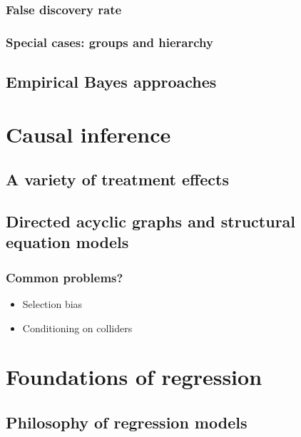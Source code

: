 \documentclass[]{book}
\providecommand{\tightlist}{%
  \setlength{\itemsep}{0pt}\setlength{\parskip}{0pt}}
\theoremstyle{definition}
\theoremstyle{definition}
\theoremstyle{definition}
\theoremstyle{remark}
\begin{document}
\subsection{False discovery rate}\label{false-discovery-rate}

\subsection{Special cases: groups and
hierarchy}\label{special-cases-groups-and-hierarchy-1}

\section{Empirical Bayes approaches}\label{empirical-bayes-approaches}

\chapter{Causal inference}\label{causal-inference}

\section{A variety of treatment
effects}\label{a-variety-of-treatment-effects}

\section{Directed acyclic graphs and structural equation
models}\label{directed-acyclic-graphs-and-structural-equation-models}

\subsection{Common problems?}\label{common-problems}

\begin{itemize}
\tightlist
\item
  Selection bias
\item
  Conditioning on colliders
\end{itemize}

\chapter{Foundations of regression}\label{foundations-of-regression}

\section{Philosophy of regression
models}\label{philosophy-of-regression-models}
\end{document}
